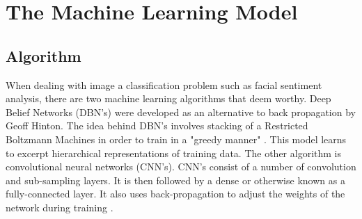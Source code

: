  	
 	


\section{The Machine Learning Model}


\subsection{Algorithm}
When dealing with image a classification problem such as facial sentiment analysis, there are two machine learning algorithms that deem worthy. Deep Belief Networks (DBN's) were developed as an alternative to back propagation by Geoff Hinton. The idea behind DBN's involves stacking of a Restricted Boltzmann Machines in order to train in a "greedy manner" \citep{dbn}. This model learns to excerpt hierarchical representations of training data. The other algorithm is convolutional neural networks (CNN's). CNN's consist of a number of convolution and sub-sampling layers. It is then followed by a dense or otherwise known as a fully-connected layer. It also uses back-propagation to adjust the weights of the network during training \citep{gupta}. 


